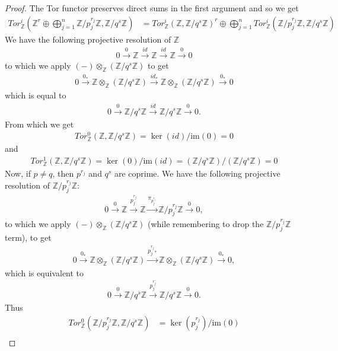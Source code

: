 \documentclass[12pt]{extarticle}
\newcommand{\im}{\text{im}}
\newcommand{\Z}{\mathbb{Z}}
\newcommand{\<}{\langle}
\renewcommand{\>}{\rangle}
\theoremstyle{definition}
\begin{document}
\begin{proof}
  
  The Tor functor preserves direct sums in the first argument and so we get
  \begin{align*}
    Tor_{\Z}^i(\Z^r \oplus \bigoplus\limits_{j=1}^n \Z/p_j^{r_j}\Z, \Z/q^s\Z) 
    &= Tor_{\Z}^i(\Z, \Z/q^s\Z)^r \oplus \bigoplus\limits_{j=1}^n Tor_{\Z}^i(\Z/p_j^{r_j}\Z, \Z/q^s\Z)
  \end{align*}
  We have the following projective resolution of $\Z$
  \begin{align*}
    0 \xrightarrow{0} \Z \xrightarrow{id} \Z \xrightarrow{id} \Z \xrightarrow{0} 0
  \end{align*}
  to which we apply $(-) \otimes_{\Z} (\Z/q^s\Z)$ to get
  \begin{align*}
    0 \xrightarrow{0_*} \Z \otimes_{\Z} (\Z/q^s\Z) \xrightarrow{id_*} \Z \otimes_{\Z} (\Z/q^s\Z) \xrightarrow{0_*} 0    
  \end{align*}
  which is equal to 
  \begin{align*}
    0 \xrightarrow{0} \Z/q^s\Z \xrightarrow{id} \Z/q^s\Z \xrightarrow{0} 0.
  \end{align*}
  From which we get
  \begin{align*}
    Tor_{\Z}^0(\Z, \Z/q^s\Z) = \ker(id)/\im(0) = 0
  \end{align*}
  and
  \begin{align*}
    Tor_{\Z}^1(\Z, \Z/q^s\Z) = \ker(0)/\im(id) = (\Z/q^s\Z)/(\Z/q^s\Z) = 0    
  \end{align*}
  Now, if $p \neq q$, then $p^{r_j}$ and $q^s$ are coprime. We have the following projective resolution of $\Z/p_j^{r_j}\Z$:
  \begin{align*}
    0 \xrightarrow{0} \Z \xrightarrow{p_j^{r_j}} \Z \xrightarrow{\pi_{p_j^{r_j}}} \Z/p_j^{r_j}\Z \xrightarrow{0} 0,
  \end{align*}
  to which we apply $(-) \otimes_{\Z} (\Z/q^s \Z)$ (while remembering to drop the $\Z/p_j^{r_j}\Z$ term), to get
  \begin{align*}
    0 \xrightarrow{0_*} \Z \otimes_{\Z} (\Z/q^s \Z) \xrightarrow{p_j^{r_j}_*} \Z \otimes_{\Z} (\Z/q^s \Z) \xrightarrow{0_*} 0,    
  \end{align*}
  which is equivalent to
  \begin{align*}
    0 \xrightarrow{0} \Z/q^s \Z \xrightarrow{p_j^{r_j}} \Z/q^s \Z \xrightarrow{0} 0.
  \end{align*}
  Thus
  \begin{align*}
    Tor_{\Z}^0(\Z/p_j^{r_j}\Z, \Z/q^s\Z) &= \ker(p_j^{r_j})/\im(0) \\

\end{align*}
\end{proof}
\end{document}
